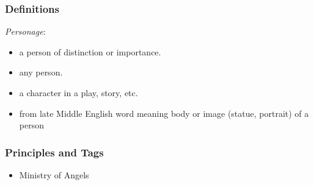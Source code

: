 \documentclass[12pt]{report}
\begin{document}
\subsubsection{Definitions\label{js:DFN3}}
\emph{Personage}: \begin{itemize}
\item a person of distinction or importance.
\item any person.
\item a character in a play, story, etc.
\item from late Middle English word meaning body or image (statue, portrait) of a person
\end{itemize}

\subsubsection{Principles and Tags\label{js:principles3}}
\begin{itemize}
\item {}Ministry of Angels
\end{itemize}
\end{document}
